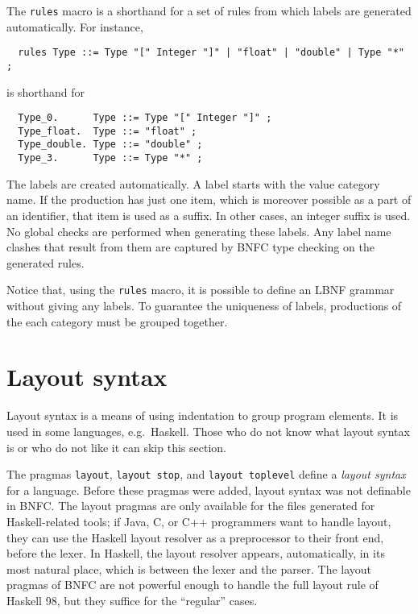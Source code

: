 \documentclass[10pt]{article}
\begin{document}
The \verb$rules$ macro is a shorthand for a set of rules from which
labels are generated automatically. For instance,
\begin{verbatim}
  rules Type ::= Type "[" Integer "]" | "float" | "double" | Type "*" ;
\end{verbatim}
is shorthand for
\begin{verbatim}
  Type_0.      Type ::= Type "[" Integer "]" ;
  Type_float.  Type ::= "float" ;
  Type_double. Type ::= "double" ;
  Type_3.      Type ::= Type "*" ;
\end{verbatim}
The labels are created automatically. A label starts with
the value category name. If the
production has just one item, which is moreover
possible as a part of an identifier, that item is
used as a suffix.
In other cases, an integer suffix is used. No global checks are
performed when generating these labels. Any label name clashes that
result from them are captured by BNFC type checking on the generated
rules.

Notice that, using the \verb$rules$ macro, it is possible to define an
LBNF grammar without giving any labels. To guarantee the uniqueness
of labels, productions of the each category must be grouped together.



\section{Layout syntax}
\label{layout}

Layout syntax is a means of using indentation to group
program elements. It is used in some languages, e.g.\ Haskell.
Those who do not know what layout syntax is or who do not like
it can skip this section.

The pragmas {\tt layout}, {\tt layout stop}, and {\tt layout toplevel}
define a {\em layout syntax} for a language.
Before these pragmas were added, layout syntax was not definable in
BNFC. The layout pragmas are only
available for the files generated for Haskell-related tools;
if Java, C, or C++ programmers want to handle layout, they can use
the Haskell layout resolver as a preprocessor to their
front end, before the lexer. In Haskell, the layout resolver
appears, automatically, in its most natural place, which is between the
lexer and the parser. The layout pragmas of BNFC are not
powerful enough to handle the full layout rule of Haskell 98,
but they suffice for the ``regular'' cases.
\end{document}
